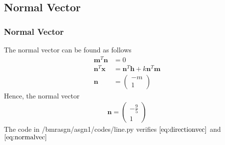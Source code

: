\documentclass{beamer}
\theoremstyle{remark}
\newcommand{\myvec}[1]{\ensuremath{\begin{pmatrix}#1\end{pmatrix}}}
\let\vec\mathbf
\numberwithin{equation}{section}
\begin{document}
\subsection{Normal Vector}
\begin{frame}
\frametitle{Normal Vector}
The normal vector can be found as follows \\
        \begin{align}
            \vec{m}^T\vec{n} &= 0 \\
            \vec{n}^T\vec{x} &= \vec{n}^T\vec{h} + k\vec{n}^T\vec{m} \\
            \vec{n} &= \myvec{-m \\ 1}
        \end{align}
Hence, the normal vector \\ 
        \begin{align}
        \label{eq:normalvec}
            \vec{n} = \myvec{-\frac{9}{5} \\ 1}
        \end{align}
The code in /bmrasgn/asgn1/codes/line.py verifies $\eqref{eq:directionvec}$ and $\eqref{eq:normalvec}$
\end{frame}
\end{document}
